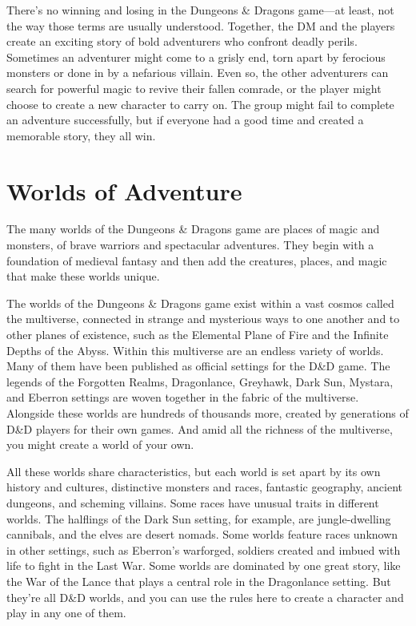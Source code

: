 There’s no winning and losing in the Dungeons \& Dragons game—at least, not the way those terms are usually understood. Together, the DM and the players create an exciting story of bold adventurers who confront deadly perils. Sometimes an adventurer might come to a grisly end, torn apart by ferocious monsters or done in by a nefarious villain. Even so, the other adventurers can search for powerful magic to revive their fallen comrade, or the player might choose to create a new character to carry on. The group might fail to complete an adventure successfully, but if everyone had a good time and created a memorable story, they all win.

\section{Worlds of Adventure}
The many worlds of the Dungeons \& Dragons game are places of magic and monsters, of brave warriors and spectacular adventures. They begin with a foundation of medieval fantasy and then add the creatures, places, and magic that make these worlds unique.

The worlds of the Dungeons \& Dragons game exist within a vast cosmos called the multiverse, connected in strange and mysterious ways to one another and to other planes of existence, such as the Elemental Plane of Fire and the Infinite Depths of the Abyss. Within this multiverse are an endless variety of worlds. Many of them have been published as official settings for the D\&D game. The legends of the Forgotten Realms, Dragonlance, Greyhawk, Dark Sun, Mystara, and Eberron settings are woven together in the fabric of the multiverse. Alongside these worlds are hundreds of thousands more, created by generations of D\&D players for their own games. And amid all the richness of the multiverse, you might create a world of your own.

All these worlds share characteristics, but each world is set apart by its own history and cultures, distinctive monsters and races, fantastic geography, ancient dungeons, and scheming villains. Some races have unusual traits in different worlds. The halflings of the Dark Sun setting, for example, are jungle-dwelling cannibals, and the elves are desert nomads. Some worlds feature races unknown in other settings, such as Eberron’s warforged, soldiers created and imbued with life to fight in the Last War. Some worlds are dominated by one great story, like the War of the Lance that plays a central role in the Dragonlance setting. But they’re all D\&D worlds, and you can use the rules here to create a character and play in any one of them.

